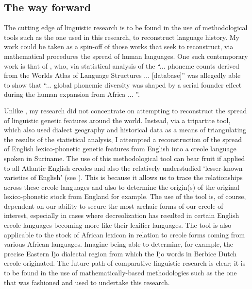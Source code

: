 \subsection{The way forward}\label{7.2.2}
The cutting edge of linguistic research is to be found in the use of methodological tools such as the one used in this research, to reconstruct language history. My work could be taken as a spin-off of those works that seek to reconstruct, via mathematical procedures the spread of human languages. One such contemporary work is that of \citet[348]{Atkinson11}, who, via statistical analysis of the ``... phoneme counts derived from the Worlds Atlas of Language Structures ... [database]'' was allegedly able to show that ``... global phonemic diversity was shaped by a serial founder effect during the human expansion from Africa ... ''.

Unlike \citet{Atkinson11}, my research did not concentrate on attempting to reconstruct the spread of linguistic genetic features around the world. Instead, via a tripartite tool, which also used dialect geography and historical data as a means of triangulating the results of the statistical analysis, I attempted a reconstruction of the spread of English lexico-phonetic genetic features from English into a creole language spoken in Suriname. The use of this methodological tool can bear fruit if applied to all Atlantic English creoles and also the relatively understudied `lesser-known varieties of English' (see \citealt{Aceto04, Williams03, Trudgill02}). This is because it allows us to trace the relationships across these creole languages and also to determine the origin(s) of the original lexico-phonetic stock from England for example.
The use of the tool is, of course, dependent on our ability to secure the most archaic forms of our creole of interest, especially in cases where decreolization has resulted in certain English creole languages becoming more like their lexifier languages. The tool is also applicable to the stock of African lexicon in relation to creole forms coming from various African languages. Imagine being able to determine, for example, the precise Eastern Ijo dialectal region from which the Ijo words in Berbice Dutch creole originated. The future path of comparative linguistic research is clear; it is to be found in the use of mathematically-based methodologies such as the one that was fashioned and used to undertake this research.
